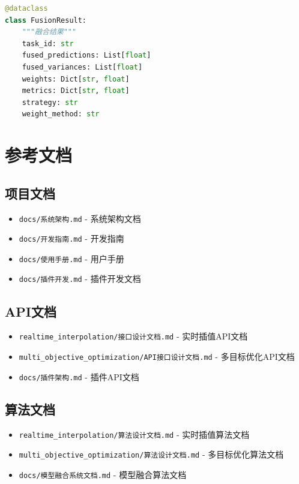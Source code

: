 \documentclass[12pt,a4paper,openany]{report}
\begin{document}
\begin{lstlisting}[language=Python, caption=FusionResult数据结构]
@dataclass
class FusionResult:
    """融合结果"""
    task_id: str
    fused_predictions: List[float]
    fused_variances: List[float]
    weights: Dict[str, float]
    metrics: Dict[str, float]
    strategy: str
    weight_method: str
\end{lstlisting}

\chapter{参考文档}

\section{项目文档}

\begin{itemize}
    \item \texttt{docs/系统架构.md} - 系统架构文档
    \item \texttt{docs/开发指南.md} - 开发指南
    \item \texttt{docs/使用手册.md} - 用户手册
    \item \texttt{docs/插件开发.md} - 插件开发文档
\end{itemize}

\section{API文档}

\begin{itemize}
    \item \texttt{realtime\_interpolation/接口设计文档.md} - 实时插值API文档
    \item \texttt{multi\_objective\_optimization/API接口设计文档.md} - 多目标优化API文档
    \item \texttt{docs/插件架构.md} - 插件API文档
\end{itemize}

\section{算法文档}

\begin{itemize}
    \item \texttt{realtime\_interpolation/算法设计文档.md} - 实时插值算法文档
    \item \texttt{multi\_objective\_optimization/算法设计文档.md} - 多目标优化算法文档
    \item \texttt{docs/模型融合系统文档.md} - 模型融合算法文档
\end{itemize}
\end{document}
